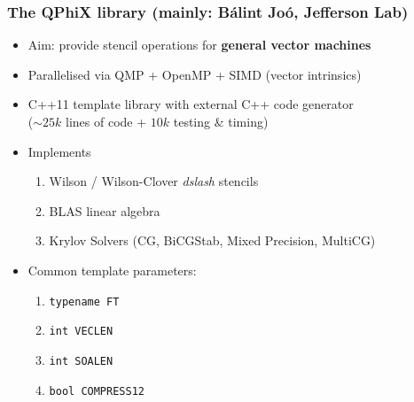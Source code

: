 \documentclass{beamer}
\begin{document}

  \begin{frame}
    \frametitle{The QPhiX library (mainly: Bálint Joó, Jefferson Lab)}

    \begin{itemize}
      \item Aim: provide stencil operations for \textbf{general vector machines}
        \vfill
      \item Parallelised via QMP + OpenMP + SIMD (vector intrinsics)
        \vfill
      \item C++11 template library with external C++ code generator\\
        ($\sim25k$ lines of code + $10k$ testing \& timing)
        \vfill
      \item Implements
        \begin{enumerate}
          \item Wilson / Wilson-Clover \textit{dslash} stencils
          \item BLAS linear algebra
          \item Krylov Solvers (CG, BiCGStab, Mixed Precision, MultiCG)
        \end{enumerate}
        \vfill
      \item Common template parameters:
        \begin{enumerate}
          \item \texttt{typename FT}
          \item \texttt{int VECLEN}
          \item \texttt{int SOALEN}
          \item \texttt{bool COMPRESS12}
        \end{enumerate}
        \vfill
    \end{itemize}

  \end{frame}

\end{document}
